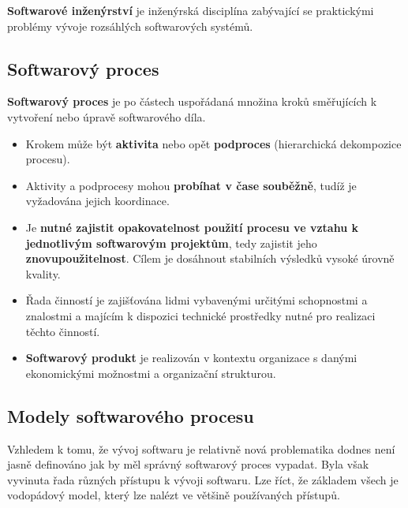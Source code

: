 \textbf{Softwarové inženýrství} je inženýrská disciplína zabývající se praktickými problémy vývoje rozsáhlých softwarových systémů.

\subsection{Softwarový proces}
\textbf{Softwarový proces} je po částech uspořádaná množina kroků směřujících k vytvoření nebo úpravě softwarového díla.
\begin{itemize}
\item Krokem může být \textbf{aktivita} nebo opět \textbf{podproces} (hierarchická dekompozice procesu). 
\item Aktivity a podprocesy mohou \textbf{probíhat v čase souběžně}, tudíž je vyžadována jejich koordinace. 
\item Je \textbf{nutné zajistit opakovatelnost použití procesu ve vztahu k jednotlivým softwarovým projektům}, tedy zajistit jeho \textbf{znovupoužitelnost}.  Cílem je dosáhnout stabilních výsledků vysoké úrovně kvality.
\item Řada činností je zajišťována lidmi vybavenými určitými schopnostmi a znalostmi a majícím k dispozici technické prostředky nutné pro realizaci těchto činností.
\item \textbf{Softwarový produkt} je realizován v kontextu organizace s danými ekonomickými možnostmi a organizační strukturou.
\end{itemize}

\subsection{Modely softwarového procesu}
Vzhledem k tomu, že vývoj softwaru je relativně nová problematika dodnes není jasně definováno jak by měl správný softwarový proces vypadat. Byla však vyvinuta řada různých přístupu k vývoji softwaru. Lze říct, že základem všech je vodopádový model, který lze nalézt ve většině používaných přístupů.

